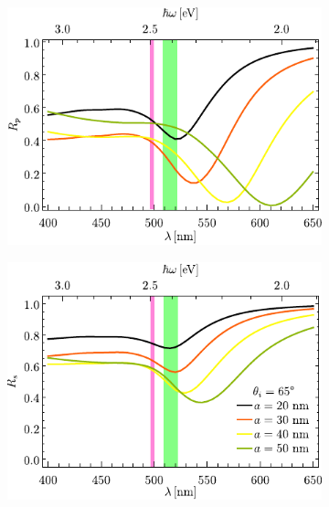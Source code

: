 \begin{figure}[h!]\centering\hspace*{-1.5em}
	\begin{subfigure}{.01\linewidth}\caption{}\label{sfig:Au-cutp-Rad}\vspace{4.5cm}\end{subfigure}
	\begin{subfigure}{.45\linewidth}\hspace*{-1.5em}
	\includegraphics[scale=1]{2-Resultados/figs/8-AurVar/cut_angle_65_p.pdf}\end{subfigure}
	\begin{subfigure}{.01\linewidth}\caption{}\label{sfig:Au-cuts-Rad}\vspace{4.5cm}\end{subfigure}\hspace*{-1.em}
	\begin{subfigure}{.45\linewidth}\centering
	\includegraphics[scale=1 ]{2-Resultados/figs/8-AurVar/cut_angle_65_s.pdf}\end{subfigure}\vspace*{-0em}\\

\end{figure}
